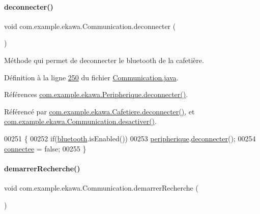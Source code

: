 \paragraph{\texorpdfstring{deconnecter()}{deconnecter()}}
{\footnotesize\ttfamily void com.\+example.\+ekawa.\+Communication.\+deconnecter (\begin{DoxyParamCaption}{ }\end{DoxyParamCaption})}



Méthode qui permet de deconnecter le bluetooth de la cafetière. 



Définition à la ligne \hyperlink{_communication_8java_source_l00250}{250} du fichier \hyperlink{_communication_8java_source}{Communication.\+java}.



Références \hyperlink{_peripherique_8java_source_l00150}{com.\+example.\+ekawa.\+Peripherique.\+deconnecter()}.



Référencé par \hyperlink{_cafetiere_8java_source_l00448}{com.\+example.\+ekawa.\+Cafetiere.\+deconnecter()}, et \hyperlink{_communication_8java_source_l00237}{com.\+example.\+ekawa.\+Communication.\+desactiver()}.


\begin{DoxyCode}
00251     \{
00252         \textcolor{keywordflow}{if}(\hyperlink{classcom_1_1example_1_1ekawa_1_1_communication_a0ed43f74b2eae7e8f150b049953da384}{bluetooth}.isEnabled())
00253             \hyperlink{classcom_1_1example_1_1ekawa_1_1_communication_a59a25b4807148701560e4341f79c0c16}{peripherique}.\hyperlink{classcom_1_1example_1_1ekawa_1_1_peripherique_aadfd24f4d783a7834c044041c7c035bb}{deconnecter}();
00254         \hyperlink{classcom_1_1example_1_1ekawa_1_1_communication_a93d9caaa9d4454a32d9dc28a6f22d2eb}{connectee} = \textcolor{keyword}{false};
00255     \}
\end{DoxyCode}
\mbox{\label{classcom_1_1example_1_1ekawa_1_1_communication_a4b8036f1d4f4f37e15c85886af645900}} 
\paragraph{\texorpdfstring{demarrer\+Recherche()}{demarrerRecherche()}}
{\footnotesize\ttfamily void com.\+example.\+ekawa.\+Communication.\+demarrer\+Recherche (\begin{DoxyParamCaption}{ }\end{DoxyParamCaption})\hspace{0.3cm}{\ttfamily [private]}}



